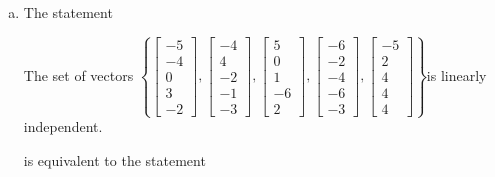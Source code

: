 \begin{exerciseAnswer}
\begin{enumerate}[(a)]
\item The statement 
\begin{center}\begin{minipage}{0.8\textwidth}
 The set of vectors \( \left\{ \left[\begin{array}{c}
-5 \\
-4 \\
0 \\
3 \\
-2
\end{array}\right] , \left[\begin{array}{c}
-4 \\
4 \\
-2 \\
-1 \\
-3
\end{array}\right] , \left[\begin{array}{c}
5 \\
0 \\
1 \\
-6 \\
2
\end{array}\right] , \left[\begin{array}{c}
-6 \\
-2 \\
-4 \\
-6 \\
-3
\end{array}\right] , \left[\begin{array}{c}
-5 \\
2 \\
4 \\
4 \\
4
\end{array}\right] \right\} \)is linearly independent.
\end{minipage}\end{center}
     is equivalent to the statement 
\begin{center}\begin{minipage}{0.8\textwidth}
 The vector equation \( x_{1} \left[\begin{array}{c}
-5 \\
-4 \\
0 \\
3 \\
-2
\end{array}\right] + x_{2} \left[\begin{array}{c}
-4 \\
4 \\

\end{array}
\end{minipage}
\end{center}
\end{enumerate}
\end{exerciseAnswer}
